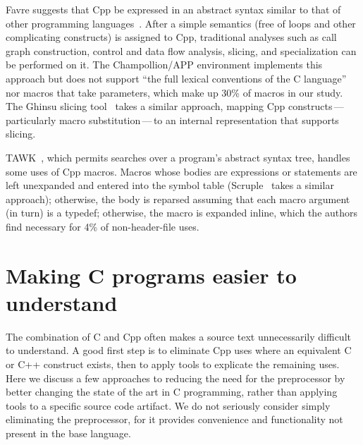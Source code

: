 \documentclass[10pt]{article}
\newcommand{\comment}[1]{\textbf{[[#1]]}}
\def\nummacrodefs{26182}        %
\begin{document}

Favre suggests that Cpp be expressed in an abstract syntax similar to that
of other programming languages~\cite{Favre96}.  After a simple semantics
(free of loops and other complicating constructs) is assigned to Cpp,
traditional analyses such as call graph construction, control and data flow
analysis, slicing, and specialization can be performed on it.  The
Champollion/APP environment implements this approach but does not support
``the full lexical conventions of the C language'' nor macros that take
parameters, which make up 30\% of macros in our study.  The Ghinsu slicing
tool~\cite{LivadasS94} takes a similar approach, mapping Cpp
constructs\,---\,particularly macro substitution\,---\,to an internal
representation that supports slicing.

TAWK~\cite{GriswoldAM96}, which permits searches over a program's abstract
syntax tree, handles some uses of Cpp macros.  Macros whose bodies are
expressions or statements are left unexpanded and entered into the symbol
table (Scruple~\cite{PaulP94} takes a similar approach); otherwise, the
body is reparsed assuming that each macro argument (in turn) is a typedef;
otherwise, the macro is expanded inline, which the authors find necessary
for 4\% of non-header-file uses.





\section{Making C programs easier to understand}
\label{sec:easier-to-understand}

The combination of C and Cpp often makes a source text unnecessarily difficult
to understand.  A good first step is to eliminate Cpp uses where an
equivalent C or C++ construct exists, then to apply tools to explicate
the remaining uses.  Here we discuss a few approaches to reducing the
need for the preprocessor by better changing the state of the art in C
programming, rather than applying tools to a specific source code
artifact.  We do not seriously consider simply eliminating the
preprocessor, for it provides convenience and functionality not present
in the base language.

\end{document}
